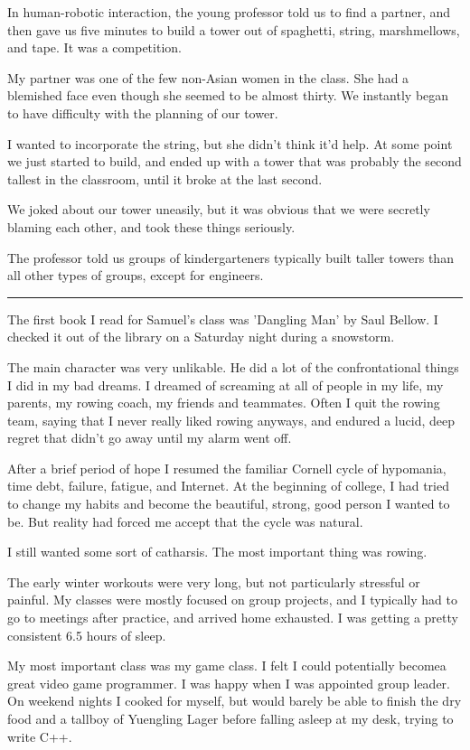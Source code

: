 In human-robotic interaction, the young professor told us to find a partner, and
then gave us five minutes to build a tower out of spaghetti, string,
marshmellows, and tape.  It was a competition.

My partner was one of the few non-Asian women in the class.  She had a blemished
face even though she seemed to be almost thirty.  We instantly began to have
difficulty with the planning of our tower.  

I wanted to incorporate the string, but she didn't think it'd help.  At some
point we just started to build, and ended up with a tower that was probably the
second tallest in the classroom, until it broke at the last second.

We joked about our tower uneasily, but it was obvious that we were secretly
blaming each other, and took these things seriously.

The professor told us groups of kindergarteners typically built taller towers
than all other types of groups, except for engineers. 

\plainfancybreak{12pt}{2}{* * *}

The first book I read for Samuel's class was 'Dangling Man' by Saul Bellow.  I
checked it out of the library on a Saturday night during a snowstorm.

The main character was very unlikable. He did a lot of the confrontational
things I did in my bad dreams.  I dreamed of screaming at all of people in my
life, my parents, my rowing coach, my friends and teammates.  Often I quit the
rowing team, saying that I never really liked rowing anyways, and endured a
lucid, deep regret that didn't go away until my alarm went off.

After a brief period of hope I resumed the familiar Cornell cycle of hypomania,
time debt, failure, fatigue, and Internet.  At the beginning of college, I had
tried to change my habits and become the beautiful, strong, good person I wanted
to be.  But reality had forced me accept that the cycle was natural.

I still wanted some sort of catharsis.  The most important thing was rowing.

The early winter workouts were very long, but not particularly stressful or
painful.  My classes were mostly focused on group projects, and I typically had
to go to meetings after practice, and arrived home exhausted.  I was getting a
pretty consistent 6.5 hours of sleep.

My most important class was my game class.  I felt I could potentially becomea
great video game programmer.  I was happy when I was appointed group leader.  On
weekend nights I cooked for myself, but would barely be able to finish the dry
food and a tallboy of Yuengling Lager before falling asleep at my desk, trying
to write C++.

